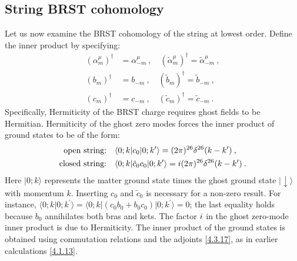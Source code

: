 \subsection*{String BRST cohomology}
Let us now examine the BRST cohomology of the string at lowest order. Define the inner product by specifying:
\begin{subequations}\label{4.3.17}
\begin{align}
	(\alpha_{m}^{\mu})^{\dagger}&=\alpha_{-m}^{\mu}\:, \quad (\tilde{\alpha}_{m}^{\mu})^{\dagger}=\tilde{\alpha}_{-m}^{\mu} \:, \label{4.3.17a} \\
	(b_{m})^{\dagger}&=b_{-m}\:, \quad (\tilde{b}_{m})^{\dagger}=\tilde{b}_{-m} \:, \label{4.3.17b} \\
	(c_{m})^{\dagger}&=c_{-m}\:, \quad  (\tilde{c}_{m})^{\dagger}=\tilde{c}_{-m} \:. \label{4.3.17c} 
\end{align}
\end{subequations}
Specifically, Hermiticity of the BRST charge requires ghost fields to be Hermitian. Hermiticity of the ghost zero modes forces the inner product of ground states to be of the form:
\begin{subequations} \label{4.3.18}
\begin{align}
	\text{open string:} &\quad \langle 0 ; k |c_{0} | 0 ; k^{\prime}\rangle=(2 \pi)^{26} \delta^{26}(k-k^{\prime}) \:, \label{4.3.18a} \\
	\text{closed string:} &\quad \langle 0 ; k |\tilde{c}_{0} c_{0}| 0 ; k^{\prime}\rangle=i(2 \pi)^{26} \delta^{26}(k-k^{\prime}) \:. \label{4.3.18b}
\end{align}
\end{subequations}
Here $|0 ; k\rangle$ represents the matter ground state times the ghost ground state $\lvert\downarrow\rangle$ with momentum $k$. Inserting $c_{0}$ and $\tilde{c}_{0}$ is necessary for a non-zero result. For instance, $\langle 0 ; k \vert 0 ; k^{\prime}\rangle=\langle 0 ; k |(c_{0} b_{0}+b_{0} c_{0})| 0 ; k^{\prime}\rangle=0$; the last equality holds because $b_{0}$ annihilates both bras and kets. The factor $i$ in the ghost zero-mode inner product is due to Hermiticity. The inner product of the ground states is obtained using commutation relations and the adjoints \eqref{4.3.17}, as in earlier calculations \eqref{4.1.13}.

